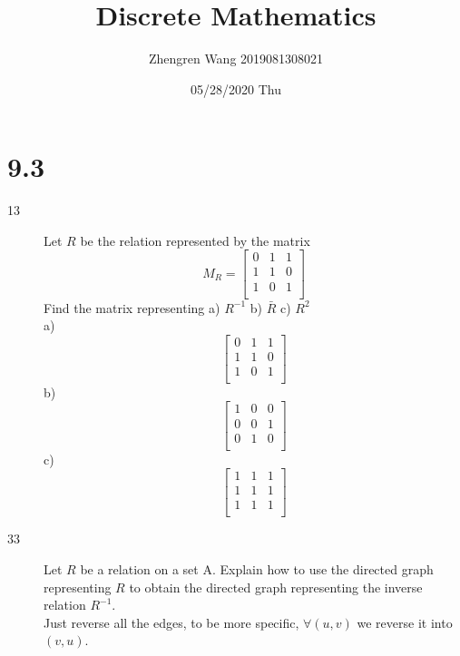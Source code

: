 \documentclass[UTF8]{article}
\title{Discrete Mathematics}
\author{Zhengren Wang 2019081308021}
\date{05/28/2020 Thu }
\begin{document}
\maketitle 

\part{9.3}
\begin{description}
    \item[13]Let $R$ be the relation represented by the matrix 
        $$
        M_R = 
        \begin{bmatrix}
            0 & 1 & 1   \\
            1 & 1 & 0   \\
            1 & 0 & 1   \\
        \end{bmatrix}
        $$
        Find the matrix representing a) $R^{-1}$ b) $\bar{R}$ c) $R^2$   \\
        a)
        $$
        \begin{bmatrix}
            0 & 1 & 1   \\
            1 & 1 & 0   \\
            1 & 0 & 1   \\
        \end{bmatrix}
        $$
        b)
        $$
        \begin{bmatrix}
            1 & 0 & 0   \\
            0 & 0 & 1   \\
            0 & 1 & 0   \\
        \end{bmatrix}
        $$
        c)
        $$
        \begin{bmatrix}
            1 & 1 & 1   \\
            1 & 1 & 1   \\
            1 & 1 & 1   \\
        \end{bmatrix}
        $$

    \item[33]Let $R$ be a relation on a set A. Explain how to use the directed graph representing $R$ to obtain the directed graph representing the inverse relation $R^{-1}$.  \\
        Just reverse all the edges, to be more specific, $\forall (u,v)$ we reverse it into $(v,u) $.

\end{description}
\end{document}
